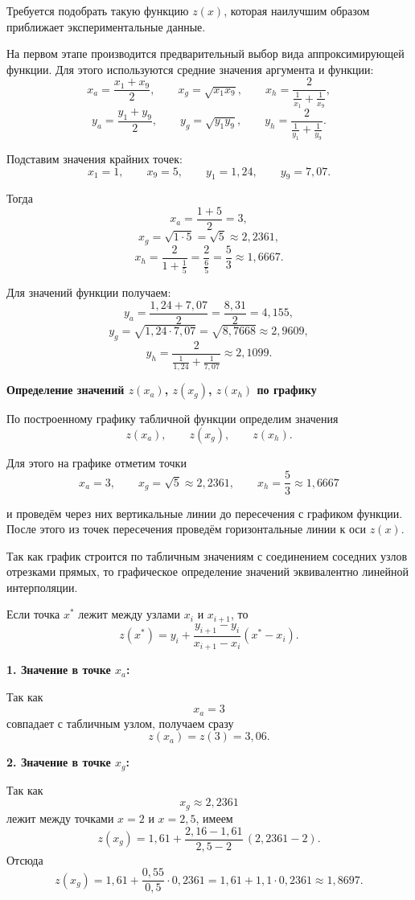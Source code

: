 Требуется подобрать такую функцию $z(x)$, которая
наилучшим образом приближает экспериментальные данные.

На первом этапе производится предварительный выбор вида аппроксимирующей
функции. Для этого используются средние значения аргумента и функции:
\[
    x_a=\frac{x_1+x_9}{2}, \qquad
    x_g=\sqrt{x_1x_9}, \qquad
    x_h=\frac{2}{\frac{1}{x_1}+\frac{1}{x_9}},
\]
\[
    y_a=\frac{y_1+y_9}{2}, \qquad
    y_g=\sqrt{y_1y_9}, \qquad
    y_h=\frac{2}{\frac{1}{y_1}+\frac{1}{y_9}}.
\]

Подставим значения крайних точек:
\[
    x_1=1,\qquad x_9=5,\qquad y_1=1{,}24,\qquad y_9=7{,}07.
\]

Тогда
\[
    x_a=\frac{1+5}{2}=3,
\]
\[
    x_g=\sqrt{1\cdot 5}=\sqrt{5}\approx 2{,}2361,
\]
\[
    x_h=\frac{2}{1+\frac{1}{5}}=\frac{2}{\frac{6}{5}}=\frac{5}{3}\approx 1{,}6667.
\]

Для значений функции получаем:
\[
    y_a=\frac{1{,}24+7{,}07}{2}=\frac{8{,}31}{2}=4{,}155,
\]
\[
    y_g=\sqrt{1{,}24\cdot 7{,}07}=\sqrt{8{,}7668}\approx 2{,}9609,
\]
\[
    y_h=\frac{2}{\frac{1}{1{,}24}+\frac{1}{7{,}07}}\approx 2{,}1099.
\]

\textbf{Определение значений $z(x_a)$, $z(x_g)$, $z(x_h)$ по графику}

По построенному графику табличной функции определим значения
\[
    z(x_a),\qquad z(x_g),\qquad z(x_h).
\]

Для этого на графике отметим точки
\[
    x_a=3,\qquad x_g=\sqrt{5}\approx 2{,}2361,\qquad x_h=\frac{5}{3}\approx 1{,}6667
\]


и проведём через них вертикальные линии до пересечения с графиком функции.
После этого из точек пересечения проведём горизонтальные линии к оси $z(x)$.

Так как график строится по табличным значениям с соединением соседних узлов
отрезками прямых, то графическое определение значений эквивалентно линейной
интерполяции.

Если точка $x^\ast$ лежит между узлами $x_i$ и $x_{i+1}$, то
\[
    z(x^\ast)=y_i+\frac{y_{i+1}-y_i}{x_{i+1}-x_i}(x^\ast-x_i).
\]

\textbf{1. Значение в точке $x_a$:}

Так как
\[
    x_a=3
\]
совпадает с табличным узлом, получаем сразу
\[
    z(x_a)=z(3)=3{,}06.
\]

\textbf{2. Значение в точке $x_g$:}

Так как
\[
    x_g\approx 2{,}2361
\]
лежит между точками $x=2$ и $x=2{,}5$, имеем
\[
    z(x_g)=1{,}61+\frac{2{,}16-1{,}61}{2{,}5-2}\,(2{,}2361-2).
\]
Отсюда
\[
    z(x_g)=1{,}61+\frac{0{,}55}{0{,}5}\cdot 0{,}2361
    =1{,}61+1{,}1\cdot 0{,}2361
    \approx 1{,}8697.
\]

